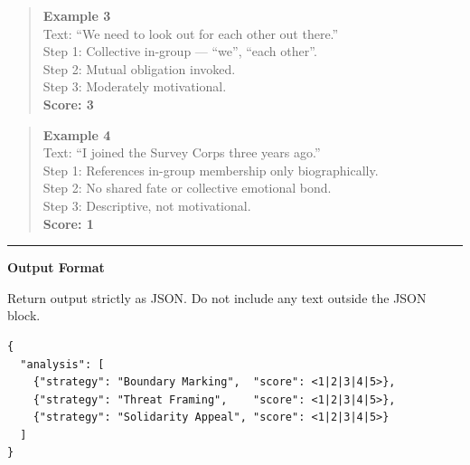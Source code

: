\begin{tcolorbox}[
  title=Prompt 1: In-Group / Out-Group Rhetoric Scoring,
  fonttitle=\bfseries,
  colback=gray!5,
  colframe=black!60,
  breakable
]
\begin{quote}
\textbf{Example 3}\\
Text: ``We need to look out for each other out there.''\\
Step 1: Collective in-group --- ``we'', ``each other''.\\
Step 2: Mutual obligation invoked.\\
Step 3: Moderately motivational.\\
\textbf{Score: 3}
\end{quote}

\begin{quote}
\textbf{Example 4}\\
Text: ``I joined the Survey Corps three years ago.''\\
Step 1: References in-group membership only biographically.\\
Step 2: No shared fate or collective emotional bond.\\
Step 3: Descriptive, not motivational.\\
\textbf{Score: 1}
\end{quote}

\medskip\hrule\medskip

\textbf{Output Format}

Return output strictly as JSON. Do not include any text outside the JSON block.

\begin{verbatim}
{
  "analysis": [
    {"strategy": "Boundary Marking",  "score": <1|2|3|4|5>},
    {"strategy": "Threat Framing",    "score": <1|2|3|4|5>},
    {"strategy": "Solidarity Appeal", "score": <1|2|3|4|5>}
  ]
}
\end{verbatim}

\end{tcolorbox}



